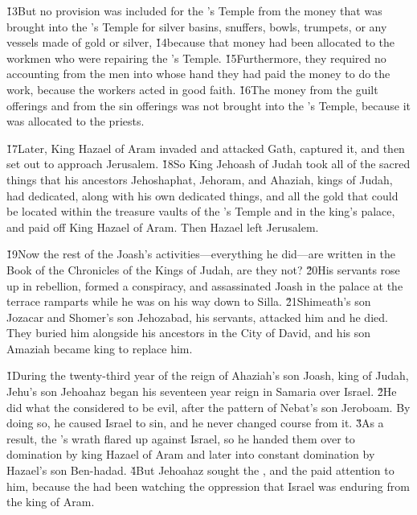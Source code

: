 \v{13}But no provision was included for the 's Temple from the money that was brought into the 's Temple for silver basins, snuffers, bowls, trumpets, or any vessels made of gold or silver, \v{14}because that money had been allocated to the workmen who were repairing the 's Temple. \v{15}Furthermore, they required no accounting from the men into whose hand they had paid the money to do the work, because the workers acted in good faith. \v{16}The money from the guilt offerings and from the sin offerings was not brought into the 's Temple, because it was allocated to the priests.

\v{17}Later, King Hazael of Aram invaded and attacked Gath, captured it, and then set out to approach Jerusalem. \v{18}So King Jehoash of Judah took all of the sacred things that his ancestors Jehoshaphat, Jehoram, and Ahaziah, kings of Judah, had dedicated, along with his own dedicated things, and all the gold that could be located within the treasure vaults of the 's Temple and in the king's palace, and paid off King Hazael of Aram. Then Hazael left Jerusalem.

\v{19}Now the rest of the Joash's activities---everything he did---are written in the Book of the Chronicles of the Kings of Judah, are they not? \v{20}His servants rose up in rebellion, formed a conspiracy, and assassinated Joash in the palace at the terrace ramparts while he was on his way down to Silla. \v{21}Shimeath's son Jozacar and Shomer's son Jehozabad, his servants, attacked him and he died. They buried him alongside his ancestors in the City of David, and his son Amaziah became king to replace him.

\v{1}During the twenty-third year of the reign of Ahaziah's son Joash, king of Judah, Jehu's son Jehoahaz began his seventeen year reign in Samaria over Israel. \v{2}He did what the  considered to be evil, after the pattern of Nebat's son Jeroboam. By doing so, he caused Israel to sin, and he never changed course from it. \v{3}As a result, the 's wrath flared up against Israel, so he handed them over to domination by king Hazael of Aram and later into constant domination by Hazael's son Ben-hadad. \v{4}But Jehoahaz sought the , and the  paid attention to him, because the  had been watching the oppression that Israel was enduring from the king of Aram.

